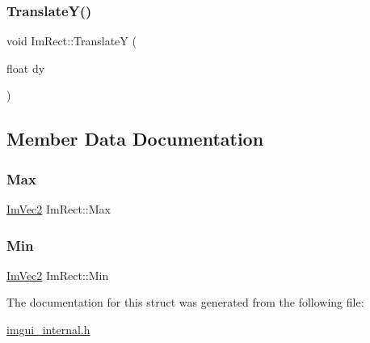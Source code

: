 \subsubsection{\texorpdfstring{Translate\+Y()}{TranslateY()}}
{\footnotesize\ttfamily void Im\+Rect\+::\+TranslateY (\begin{DoxyParamCaption}\item[{float}]{dy }\end{DoxyParamCaption})\hspace{0.3cm}{\ttfamily [inline]}}



\subsection{Member Data Documentation}
\mbox{\label{struct_im_rect_aad58c13340d320b350a72a037e3f7628}} 
\subsubsection{\texorpdfstring{Max}{Max}}
{\footnotesize\ttfamily \mbox{\hyperlink{struct_im_vec2}{Im\+Vec2}} Im\+Rect\+::\+Max}

\mbox{\label{struct_im_rect_af8f3fbf7ec983e03548b88e14ba68aa8}} 
\subsubsection{\texorpdfstring{Min}{Min}}
{\footnotesize\ttfamily \mbox{\hyperlink{struct_im_vec2}{Im\+Vec2}} Im\+Rect\+::\+Min}



The documentation for this struct was generated from the following file\+:\begin{DoxyCompactItemize}
\item 
\mbox{\hyperlink{imgui__internal_8h}{imgui\+\_\+internal.\+h}}\end{DoxyCompactItemize}
